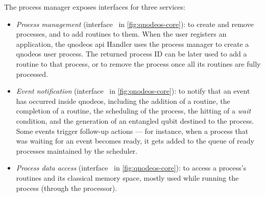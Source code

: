 The process manager exposes interfaces for three services:
\begin{itemize}
    \item \emph{Process management} (interface~ in \cref{fig:qnodeos-core}): to create
          and remove processes, and to add routines to them. When the user registers an application,
          the \acrshort{qnodeos} \acrshort{api} Handler uses the process manager to create a
          \acrshort{qnodeos} user process. The returned process ID can be later used to add a
          routine to that process, or to remove the process once all its routines are fully
          processed.
    \item \emph{Event notification} (interface~ in \cref{fig:qnodeos-core}): to notify
          that an event has occurred inside \acrshort{qnodeos}, including the addition of a routine,
          the completion of a routine, the scheduling of the process, the hitting of a \emph{wait}
          condition, and the generation of an entangled qubit destined to the process. Some events
          trigger follow-up actions --- for instance, when a process that was waiting for an event
          becomes ready, it gets added to the queue of ready processes maintained by the scheduler.
    \item \emph{Process data access} (interface~ in \cref{fig:qnodeos-core}): to access a
          process's routines and its classical memory space, mostly used while running the process
          (through the processor).
\end{itemize}

